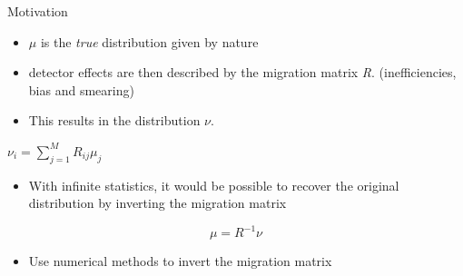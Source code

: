 \documentclass[
		10pt
		]{beamer}
\begin{document}
\begin{frame}{Motivation}
	\begin{itemize}
		\item $\mu$ is the \textit{true} distribution given by nature
		\item detector effects are then described by the migration matrix \textit{R}. (inefficiencies, bias and smearing)
		\item This results in the distribution $\nu$. 
	\end{itemize}
		\begin{center}
$		\nu_i = \sum_{j=1}^{M} R_{ij} \mu_j$  
		\end{center}
	
	\begin{itemize}		
		\item With infinite statistics, it would be possible to recover the original distribution by inverting the migration matrix
		
	\end{itemize}

\begin{equation*}
	\mu = R^{-1} \nu
\end{equation*}

\begin{itemize}
	\item Use numerical methods to invert the migration matrix
\end{itemize}


\end{frame}
\end{document}
